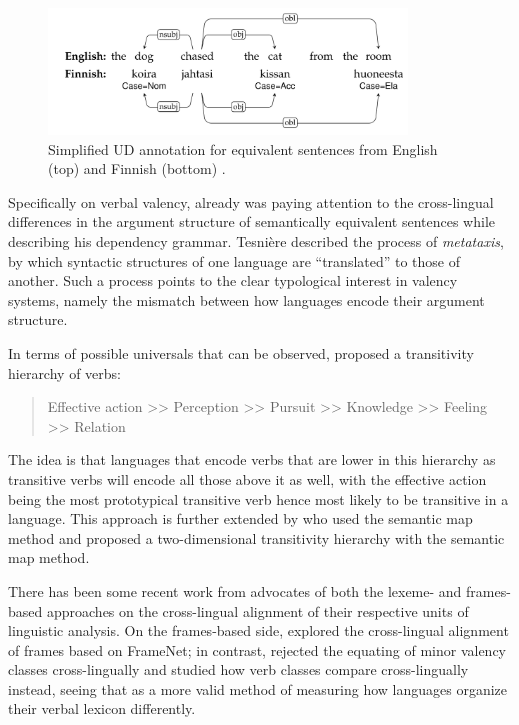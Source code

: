 \begin{figure}
    \includegraphics[width=0.85\textwidth]{figures/ud_example_sentence.png}
    \centering
    \caption{Simplified UD annotation for equivalent sentences from English (top) and Finnish (bottom) \citep{demarneffe2021}.}\label{fig:ud-example-sentence}
\end{figure}

Specifically on verbal valency, already \citet{tesniere1959} was paying attention to the cross-lingual differences in the argument structure of semantically equivalent sentences while describing his dependency grammar. Tesnière described the process of \textit{metataxis}, by which syntactic structures of one language are ``translated'' to those of another. Such a process points to the clear typological interest in valency systems, namely the mismatch between how languages encode their argument structure.

In terms of possible universals that can be observed, \citet{tsunoda1981, tsunoda1985} proposed a transitivity hierarchy of verbs:
\begin{quote}
    Effective action >> Perception >> Pursuit >> Knowledge >> Feeling >> Relation
\end{quote}
The idea is that languages that encode verbs that are lower in this hierarchy as transitive verbs will encode all those above it as well, with the effective action being the most prototypical transitive verb hence most likely to be transitive in a language. This approach is further extended by \cite{malchukov2005} who used the semantic map method and proposed a two-dimensional transitivity hierarchy with the semantic map method. 

There has been some recent work from advocates of both the lexeme- and frames-based approaches on the cross-lingual alignment of their respective units of linguistic analysis. On the frames-based side, \citet{baker2020, ellsworth2021} explored the cross-lingual alignment of frames based on FrameNet; in contrast, \citet{say2014} rejected the equating of minor valency classes cross-lingually and studied how verb classes compare cross-lingually instead, seeing that as a more valid method of measuring how languages organize their verbal lexicon differently.

